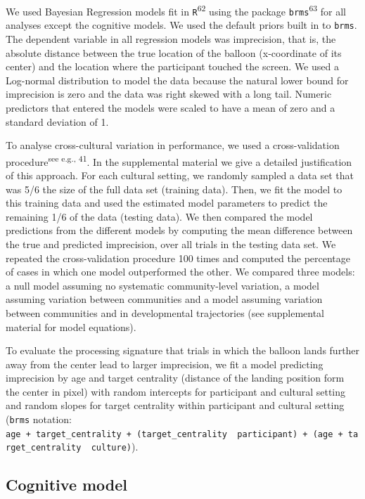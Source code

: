 \documentclass[
  man,floatsintext]{apa6}
\begin{document}
We used Bayesian Regression models fit in \texttt{R}\textsuperscript{62} using the package \texttt{brms}\textsuperscript{63} for all analyses except the cognitive models. We used the default priors built in to \texttt{brms}. The dependent variable in all regression models was imprecision, that is, the absolute distance between the true location of the balloon (x-coordinate of its center) and the location where the participant touched the screen. We used a Log-normal distribution to model the data because the natural lower bound for imprecision is zero and the data was right skewed with a long tail. Numeric predictors that entered the models were scaled to have a mean of zero and a standard deviation of 1.

To analyse cross-cultural variation in performance, we used a cross-validation procedure\textsuperscript{see e.g., 41}. In the supplemental material we give a detailed justification of this approach. For each cultural setting, we randomly sampled a data set that was 5/6 the size of the full data set (training data). Then, we fit the model to this training data and used the estimated model parameters to predict the remaining 1/6 of the data (testing data). We then compared the model predictions from the different models by computing the mean difference between the true and predicted imprecision, over all trials in the testing data set. We repeated the cross-validation procedure 100 times and computed the percentage of cases in which one model outperformed the other. We compared three models: a null model assuming no systematic community-level variation, a model assuming variation between communities and a model assuming variation between communities and in developmental trajectories (see supplemental material for model equations).

To evaluate the processing signature that trials in which the balloon lands further away from the center lead to larger imprecision, we fit a model predicting imprecision by age and target centrality (distance of the landing position form the center in pixel) with random intercepts for participant and cultural setting and random slopes for target centrality within participant and cultural setting (\texttt{brms} notation: \texttt{age\ +\ target\_centrality\ +\ (target\_centrality\ \textbar{}\ participant)\ +\ (age\ +\ target\_centrality\ \textbar{}\ culture)}).

\hypertarget{cognitive-model}{%
\subsection{Cognitive model}\label{cognitive-model}}
\end{document}
